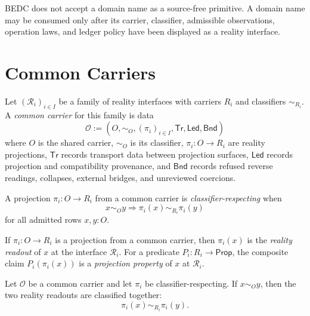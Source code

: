 \begin{principle}
\label{prin:unified-reality-interface-before-domain}
BEDC does not accept a domain name as a source-free primitive. A domain
name may be consumed only after its carrier, classifier, admissible
observations, operation laws, and ledger policy have been displayed as a
reality interface.
\end{principle}

\section{Common Carriers}
\label{sec:unified-reality-common-carriers}

\begin{definition}
\label{def:unified-reality-common-carrier}
Let $(\mathcal R_i)_{i\in I}$ be a family of reality interfaces with
carriers $R_i$ and classifiers $\sim_{R_i}$. A \emph{common carrier} for
this family is data
$$
\mathcal O
:=
(O,\sim_O,(\pi_i)_{i\in I},\mathsf{Tr},\mathsf{Led},\mathsf{Bnd})
$$
where $O$ is the shared carrier, $\sim_O$ is its classifier,
$\pi_i:O\to R_i$ are reality projections, $\mathsf{Tr}$ records
transport data between projection surfaces, $\mathsf{Led}$ records
projection and compatibility provenance, and $\mathsf{Bnd}$ records
refused reverse readings, collapses, external bridges, and unreviewed
coercions.
\end{definition}

\begin{definition}
\label{def:unified-reality-classifier-respecting-projection}
A projection $\pi_i:O\to R_i$ from a common carrier is
\emph{classifier-respecting} when
$$
x\sim_O y
\Longrightarrow
\pi_i(x)\sim_{R_i}\pi_i(y)
$$
for all admitted rows $x,y:O$.
\end{definition}

\begin{definition}
\label{def:unified-reality-projection}
If $\pi_i:O\to R_i$ is a projection from a common carrier, then
$\pi_i(x)$ is the \emph{reality readout} of $x$ at the interface
$\mathcal R_i$. For a predicate $P_i:R_i\to\mathsf{Prop}$, the composite
claim $P_i(\pi_i(x))$ is a \emph{projection property} of $x$ at
$\mathcal R_i$.
\end{definition}

\begin{theorem}
\label{thm:unified-reality-projection-preserves-classifier}
Let $\mathcal O$ be a common carrier and let $\pi_i$ be
classifier-respecting. If $x\sim_O y$, then the two reality readouts are
classified together:
$$
\pi_i(x)\sim_{R_i}\pi_i(y).
$$
\end{theorem}

